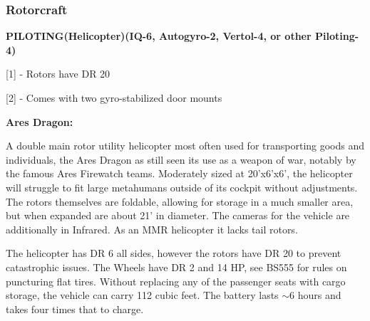 \subsubsection{Rotorcraft}

\textbf{PILOTING(Helicopter)(IQ-6, Autogyro-2, Vertol-4, or other Piloting-4)}
\begin{center} 
	\begin{adjustwidth}{-9.5mm}{}
	\end{adjustwidth}
\end{center}

[1] - Rotors have DR 20

[2] - Comes with two gyro-stabilized door mounts


\textbf{Ares Dragon:}

A double main rotor utility helicopter most often used for transporting goods and individuals, the Ares Dragon as still seen its use as a weapon of war, notably by the famous Ares Firewatch teams. Moderately sized at 20'x6'x6', the helicopter will struggle to fit large metahumans outside of its cockpit without adjustments. The rotors themselves are foldable, allowing for storage in a much smaller area, but when expanded are about 21' in diameter. The cameras for the vehicle are additionally in Infrared. As an MMR helicopter it lacks tail rotors.

The helicopter has DR 6 all sides, however the rotors have DR 20 to prevent catastrophic issues. The Wheels have DR 2 and 14 HP, see BS555 for rules on puncturing flat tires. Without replacing any of the passenger seats with cargo storage, the vehicle can carry 112 cubic feet. The battery lasts $\sim$6 hours and takes four times that to charge.

